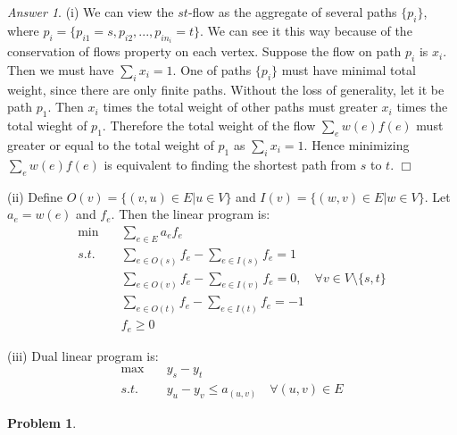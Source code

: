 \documentclass[10pt,a4paper]{article}
\theoremstyle{plain}
\theoremstyle{definition}
\newtheorem{problem}{Problem}
\theoremstyle{remark}
\newtheorem*{answer*}{Answer}
\newcommand\QED{\hfill $\Box$} %
\newcommand{\<}{\langle}
\renewcommand{\>}{\rangle}
\begin{document}
\begin{answer*} \hfill

(i) We can view the $st$-flow as the aggregate of several paths $\{p_i\}$, where $p_i = \{p_{i1} = s, p_{i2}, ..., p_{in_i} = t\}$. We can see it this way because of the conservation of flows property on each vertex.  Suppose the flow on path $p_i$ is $x_i$. Then we must have $\sum_i x_i = 1$. One of paths $\{p_i\}$ must have minimal total weight, since there are only finite paths. Without the loss of generality, let it be path $p_1$. Then $x_i$ times the total weight of other paths must greater $x_i$ times the total wieght of $p_1$. Therefore the total weight of the flow $\sum_e w(e)f(e)$ must greater or equal to the total weight of $p_1$ as $\sum_i x_i = 1$. Hence minimizing $\sum_e w(e)f(e)$ is equivalent to finding the shortest path from $s$ to $t$. \QED

(ii) Define $O(v) = \{(v,u)\in E\vert u\in V\}$ and $I(v) = \{(w,v)\in E \vert w\in V\}$. Let $a_e = w(e)$ and $f_e$. Then the linear program is:
\begin{align*}
\min \quad &\sum_{e\in E}a_ef_e \\
s.t. \quad &\sum_{e\in O(s)}f_e-\sum_{e\in I(s)}f_e = 1 \\
& \sum_{e\in O(v)}f_e-\sum_{e\in I(v)}f_e = 0,\quad \forall v\in V\setminus \{s,t\} \\
&\sum_{e\in O(t)}f_e-\sum_{e\in I(t)}f_e = -1 \\
& f_e\geq 0
\end{align*}


(iii) Dual linear program is:
\begin{align*}
\max \quad & y_s-y_t \\
s.t. \quad & y_u-y_v \leq a_{(u,v)} \quad \forall (u,v)\in E
\end{align*}
\end{answer*}


\newpage
\begin{problem}
\end{problem}
\end{document}
